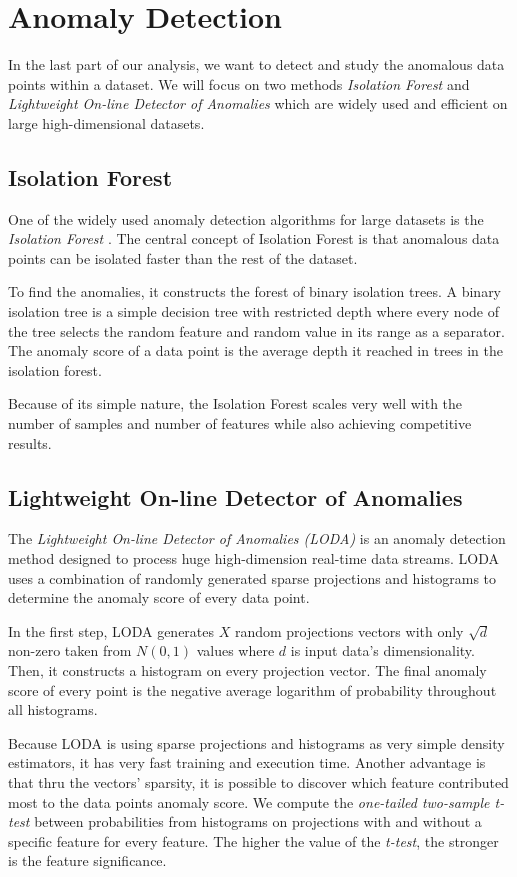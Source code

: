 \section{Anomaly Detection}
In the last part of our analysis, we want to detect and study the anomalous data points within a dataset. We will focus on two methods \textit{Isolation Forest} and \textit{Lightweight On-line Detector of Anomalies} which are widely used and efficient on large high-dimensional datasets.

\subsection{Isolation Forest}
One of the widely used anomaly detection algorithms for large datasets is the \textit{Isolation Forest} \cite{vis:isoforest}. The central concept of Isolation Forest is that anomalous data points can be isolated faster than the rest of the dataset. 

To find the anomalies, it constructs the forest of binary isolation trees. A binary isolation tree is a simple decision tree with restricted depth where every node of the tree selects the random feature and random value in its range as a separator. The anomaly score of a data point is the average depth it reached in trees in the isolation forest.

Because of its simple nature, the Isolation Forest scales very well with the number of samples and number of features while also achieving competitive results.

\subsection{Lightweight On-line Detector of Anomalies}
The \textit{Lightweight On-line Detector of Anomalies (LODA)} is an anomaly detection method designed to process huge high-dimension real-time data streams. LODA uses a combination of randomly generated sparse projections and histograms to determine the anomaly score of every data point.

In the first step, LODA generates $X$ random projections vectors with only $\sqrt{d}$ non-zero taken from $N(0, 1)$ values where $d$ is input data's dimensionality. Then, it constructs a histogram on every projection vector. The final anomaly score of every point is the negative average logarithm of probability throughout all histograms.

Because LODA is using sparse projections and histograms as very simple density estimators, it has very fast training and execution time. Another advantage is that thru the vectors' sparsity, it is possible to discover which feature contributed most to the data points anomaly score. We compute the \textit{one-tailed two-sample t-test} between probabilities from histograms on projections with and without a specific feature for every feature. The higher the value of the \textit{t-test}, the stronger is the feature significance.


